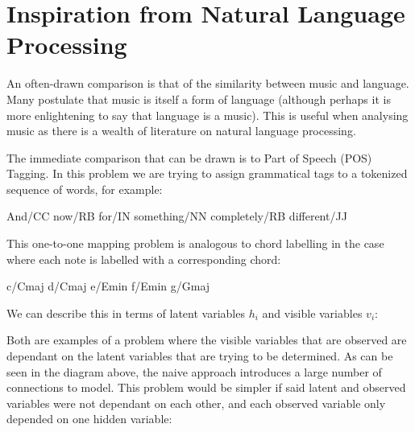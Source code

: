 \documentclass[bsc,singlespacing,logo, parskip, deptreport]{infthesis}
\begin{document}
\section{Inspiration from Natural Language Processing}

An often-drawn comparison is that of the similarity between music and language. Many postulate that music is itself a form of language \cite{cohen2008music} (although perhaps it is more enlightening to say that language is a music). This is useful when analysing music as there is a wealth of literature on natural language processing.

The immediate comparison that can be drawn is to Part of Speech (POS) Tagging. In this problem we are trying to assign grammatical tags to a tokenized sequence of words, for example:

And/CC now/RB for/IN something/NN completely/RB different/JJ

This one-to-one mapping problem is analogous to chord labelling in the case where each note is labelled with a corresponding chord:

c/Cmaj d/Cmaj e/Emin f/Emin g/Gmaj

We can describe this in terms of latent variables $h_i$ and visible variables $v_i$:

\begin{center}
\end{center}

Both are examples of a problem where the visible variables that are observed are dependant on the latent variables that are trying to be determined. As can be seen in the diagram above, the naive approach introduces a large number of connections to model.  This problem would be simpler if said latent and observed variables were not dependant on each other, and each observed variable only depended on one hidden variable:
\end{document}

